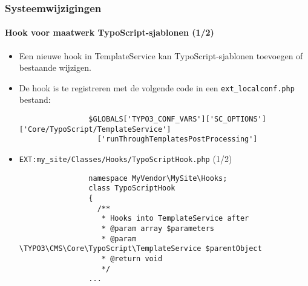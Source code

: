 \begin{frame}[fragile]
	\frametitle{Systeemwijzigingen}
	\framesubtitle{Hook voor maatwerk TypoScript-sjablonen (1/2)}

	\lstset{basicstyle=\tiny\ttfamily}

	\begin{itemize}
		\item Een nieuwe hook in TemplateService kan TypoScript-sjablonen toevoegen of bestaande wijzigen.

		\item De hook is te registreren met de volgende code in een \texttt{ext\_localconf.php} bestand:

			\begin{lstlisting}
				$GLOBALS['TYPO3_CONF_VARS']['SC_OPTIONS']['Core/TypoScript/TemplateService']
				  ['runThroughTemplatesPostProcessing']
			\end{lstlisting}

		\item \texttt{EXT:my\_site/Classes/Hooks/TypoScriptHook.php} (1/2)

			\begin{lstlisting}
				namespace MyVendor\MySite\Hooks;
				class TypoScriptHook
				{
				  /**
				   * Hooks into TemplateService after
				   * @param array $parameters
				   * @param \TYPO3\CMS\Core\TypoScript\TemplateService $parentObject
				   * @return void
				   */
				...
			\end{lstlisting}

	\end{itemize}

\end{frame}


